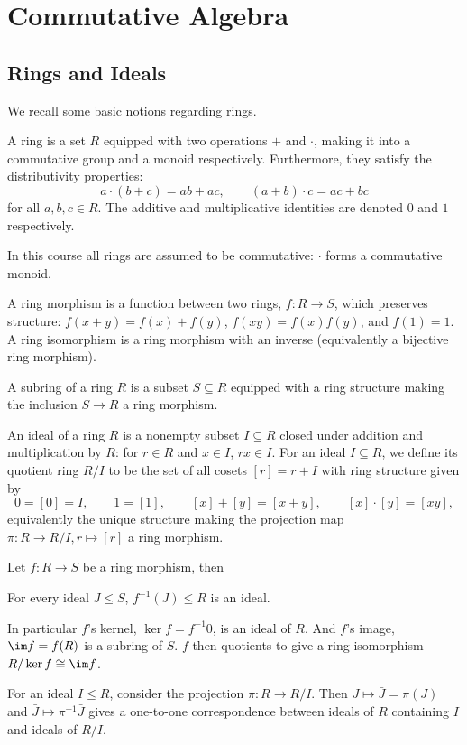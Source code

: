 \section{Commutative Algebra}

\subsection{Rings and Ideals}

We recall some basic notions regarding rings.

\bdefn

    A {\emphcolor ring} is a set $R$ equipped with two operations $+$ and $\cdot$, making it into a commutative group and a monoid respectively.
    Furthermore, they satisfy the distributivity properties:
    $$ a\cdot(b+c) = ab + ac,\qquad (a+b)\cdot c = ac + bc $$
    for all $a,b,c\in R$.
    The additive and multiplicative identities are denoted $0$ and $1$ respectively.

\edefn

\bnote

    In this course all rings are assumed to be {\emphcolor commutative}: $\cdot$ forms a commutative monoid.

\enote

\bdefn

    A {\emphcolor ring morphism} is a function between two rings, $f\colon R\to S$, which preserves structure: $f(x+y)=f(x)+f(y)$, $f(xy)=f(x)f(y)$,
    and $f(1)=1$.
    A {\emphcolor ring isomorphism} is a ring morphism with an inverse (equivalently a bijective ring morphism).

    A {\emphcolor subring} of a ring $R$ is a subset $S\subseteq R$ equipped with a ring structure making the inclusion $S\to R$ a ring morphism.

    An {\emphcolor ideal} of a ring $R$ is a nonempty subset $I\subseteq R$ closed under addition and multiplication by $R$: for $r\in R$ and $x\in I$,
    $rx\in I$.
    For an ideal $I\subseteq R$, we define its {\emphcolor quotient ring} $R/I$ to be the set of all cosets $[r]=r+I$ with ring structure given by
    $$ 0 = [0] = I,\qquad 1 = [1],\qquad [x] + [y] = [x+y],\qquad [x]\cdot[y] = [xy] , $$
    equivalently the unique structure making the projection map $\pi\colon R\to R/I,r\mapsto[r]$ a ring morphism.

\edefn

\bprop

    Let $f\colon R\to S$ be a ring morphism, then
    \benum
        \item For every ideal $J\leq S$, $f^{-1}(J)\leq R$ is an ideal.
        \item In particular $f$'s {\emphcolor kernel}, $\ker f=f^{-1}0$, is an ideal of $R$.
        And $f$'s {\emphcolor image}, $\im f=f(R)$ is a subring of $S$.
        $f$ then quotients to give a ring isomorphism $R/\ker f\cong\im f$.
        \item For an ideal $I\leq R$, consider the projection $\pi\colon R\to R/I$.
        Then $J\mapsto\bar J=\pi(J)$ and $\bar J\mapsto\pi^{-1}\bar J$ gives a one-to-one correspondence between ideals of $R$ containing $I$
        and ideals of $R/I$.
    \eenum

